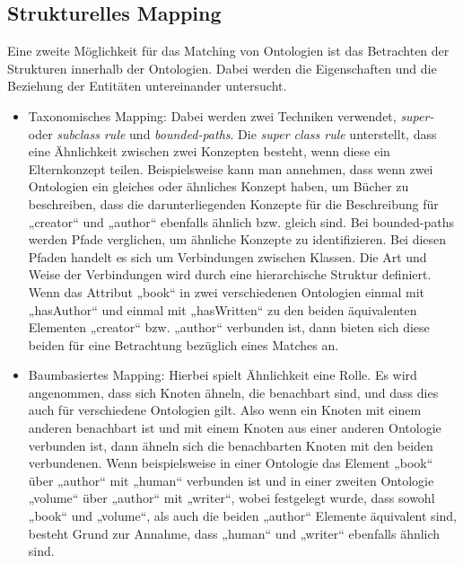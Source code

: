 		\subsection{Strukturelles Mapping}
		Eine zweite Möglichkeit für das Matching von Ontologien ist das Betrachten der Strukturen innerhalb der Ontologien. Dabei werden die Eigenschaften und die Beziehung der Entitäten untereinander untersucht.
		\begin{itemize}
			\item Taxonomisches Mapping: Dabei werden zwei Techniken verwendet,
			\textit{super-} oder  \textit{subclass rule} und \textit{bounded-paths}. Die
			\textit{super class rule} unterstellt, dass eine Ähnlichkeit zwischen zwei
			Konzepten besteht, wenn diese ein Elternkonzept teilen. \cite{Euz07}  Beispielsweise kann man annehmen, dass wenn zwei Ontologien ein gleiches oder ähnliches Konzept haben, um Bücher zu beschreiben, dass die darunterliegenden Konzepte für die Beschreibung für „creator“ und „author“ ebenfalls ähnlich bzw. gleich sind. Bei bounded-paths werden Pfade verglichen, um ähnliche Konzepte zu identifizieren. Bei diesen Pfaden handelt es sich um Verbindungen zwischen Klassen. Die Art und Weise der Verbindungen wird durch eine hierarchische Struktur definiert. \cite{Euz07} Wenn das Attribut „book“ in zwei verschiedenen Ontologien einmal mit „hasAuthor“ und einmal mit „hasWritten“ zu den beiden äquivalenten Elementen „creator“ bzw. „author“ verbunden ist, dann bieten sich diese beiden für eine Betrachtung bezüglich eines Matches an.
			\item Baumbasiertes Mapping: Hierbei spielt Ähnlichkeit eine Rolle. Es wird
			angenommen, dass sich Knoten ähneln, die benachbart sind, und dass dies auch für verschiedene Ontologien gilt. Also wenn ein Knoten mit einem anderen benachbart ist und mit einem Knoten aus einer anderen Ontologie verbunden ist, dann ähneln sich die benachbarten Knoten mit den beiden verbundenen. Wenn beispielsweise in einer Ontologie das Element „book“ über „author“ mit „human“ verbunden ist und in einer zweiten Ontologie „volume“ über „author“ mit „writer“, wobei festgelegt wurde, dass sowohl „book“ und „volume“, als auch die beiden „author“ Elemente äquivalent sind, besteht Grund zur Annahme, dass „human“ und „writer“ ebenfalls ähnlich sind. \cite{Euz07} 
		\end{itemize}
		
